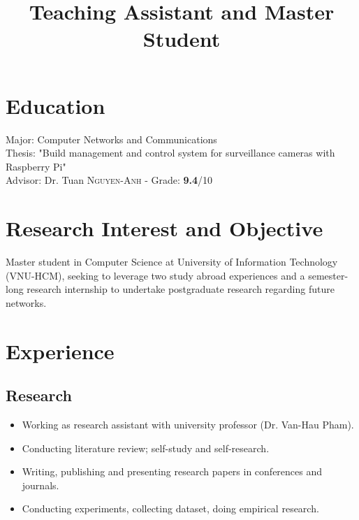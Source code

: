 \documentclass[11pt,a4paper,roman]{moderncv}        %
\title{Teaching Assistant and Master Student}                               %
\begin{document}
\makecvtitle

\section{Education}
{Major: Computer Networks and Communications
\\ Thesis: "Build management and control system for surveillance cameras with Raspberry Pi"
\\ Advisor: Dr. Tuan \textsc{Nguyen-Anh} - Grade: \textbf{9.4}/10\\}  %


\section{Research Interest and Objective}
Master student in Computer Science at University of Information Technology (VNU-HCM), seeking to leverage two study abroad experiences and a semester-long research internship to undertake postgraduate research regarding future networks. 


\section{Experience}
\subsection{Research}
\begin{itemize}
	\item Working as research assistant with university professor (Dr. Van-Hau Pham).
	\item Conducting literature review; self-study and self-research.
	\item Writing, publishing and presenting research papers in conferences and journals.
	\item Conducting experiments, collecting dataset, doing empirical research.

\end{itemize}
\end{document}
